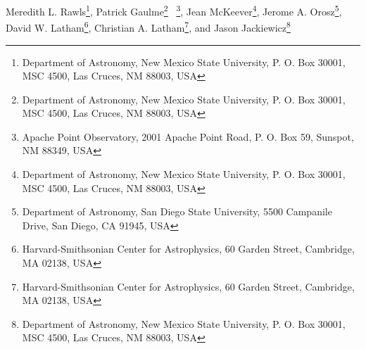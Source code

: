 
Meredith L. Rawls\footnote{Department of Astronomy, New Mexico State University, P. O. Box 30001, MSC 4500, Las Cruces, NM 88003, USA},
\setcounter{footnote}{0}
Patrick Gaulme\footnote{Department of Astronomy, New Mexico State University, P. O. Box 30001, MSC 4500, Las Cruces, NM 88003, USA} \ \footnote{Apache Point Observatory, 2001 Apache Point Road, P. O. Box 59, Sunspot, NM 88349, USA},
\setcounter{footnote}{0}
Jean McKeever\footnote{Department of Astronomy, New Mexico State University, P. O. Box 30001, MSC 4500, Las Cruces, NM 88003, USA},
\setcounter{footnote}{2}
Jerome A. Orosz\footnote{Department of Astronomy, San Diego State University, 5500 Campanile Drive, San Diego, CA 91945, USA},
David W. Latham\footnote{Harvard-Smithsonian Center for Astrophysics, 60 Garden Street, Cambridge, MA 02138, USA},
\setcounter{footnote}{3}
Christian A. Latham\footnote{Harvard-Smithsonian Center for Astrophysics, 60 Garden Street, Cambridge, MA 02138, USA}, and 
\setcounter{footnote}{0}
Jason Jackiewicz\footnote{Department of Astronomy, New Mexico State University, P. O. Box 30001, MSC 4500, Las Cruces, NM 88003, USA}
  
  